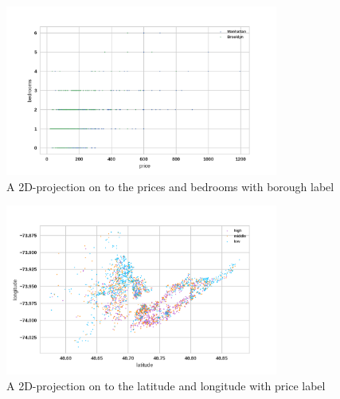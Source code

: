 \documentclass[12pt]{article}
\begin{document}
\begin{figure}[htb]
\centering
\includegraphics[width = 0.8\textwidth]{images/pair-bedrooms-price.png}
\caption{A 2D-projection on to the prices and bedrooms with borough label}
\label{fig:pair-bedrooms-price}
\end{figure}
\begin{figure}[htb]
\centering
\includegraphics[width = 0.8\textwidth]{images/pair-latitude-longitude-price.png}
\caption{A 2D-projection on to the latitude and longitude with price label}
\label{fig:pair-latitude-longitude-price}
\end{figure}
\end{document}
